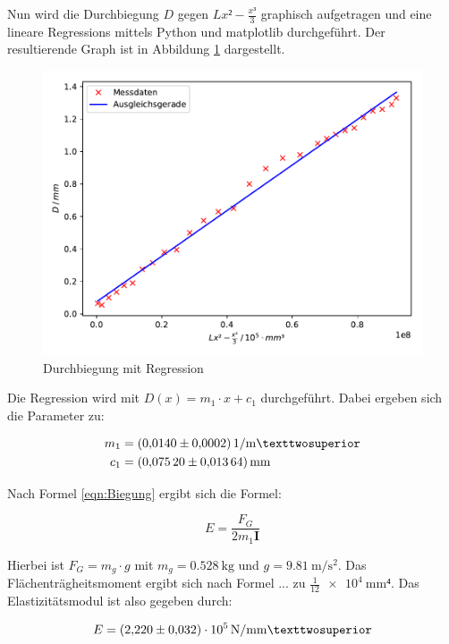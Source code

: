 Nun wird die Durchbiegung $D$ gegen $Lx²-\frac{x³}{3}$ graphisch aufgetragen
und eine lineare Regressions mittels Python und matplotlib durchgeführt.
Der resultierende Graph ist in Abbildung \ref{fig:plot1} dargestellt.

\begin{figure}
  \centering
  \includegraphics[scale=0.8]{content/plot1.pdf}
  \caption{Durchbiegung mit Regression}
  \label{fig:plot1}
\end{figure}

Die Regression wird mit $D(x) = m_1\cdot x + c_1$ durchgeführt. Dabei ergeben 
sich die Parameter zu: 

\begin{align*}
m_1 &= \SI{0.0140+-0.0002}{1\per\meter²}\\
c_1 &= \SI{0.0752+-0.01364}{\milli\meter}
\end{align*}

Nach Formel \eqref{eqn:Biegung} ergibt sich die Formel: 

\begin{equation*}
E = \frac{F_G}{2m_1\symbf{I}}
\end{equation*}

Hierbei ist $F_G = m_g\cdot g$ mit $m_g = \SI{0.528}{\kilo\gram}$ und 
$g = \SI{9.81}{\meter\per\second\squared}$. Das Flächenträgheitsmoment
ergibt sich nach Formel ... zu $\frac{1}{12} \SI{e4}{\milli\meter⁴}$. 
Das Elastizitätsmodul ist also gegeben durch: 

\begin{equation*}
E = \SI{2.220+-0.032e5}{\newton\per\milli\meter²}
\end{equation*}


